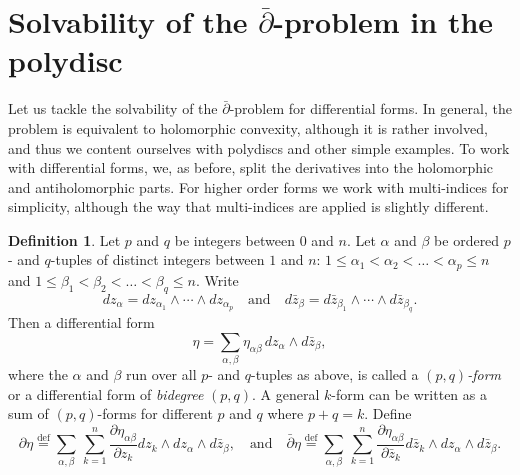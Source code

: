 \documentclass[12pt,openany]{book}
\newcommand{\myindex}[1]{#1\index{#1}}
\theoremstyle{plain}
\theoremstyle{remark}
\theoremstyle{definition}
\newtheorem{defn}[thm]{Definition}
\theoremstyle{exercise}
\theoremstyle{example}
\begin{document}

\section{Solvability of the \texorpdfstring{$\bar{\partial}$}{dbar}-problem in the polydisc} \label{sec:dbarpoly}

Let us tackle the solvability of the $\bar{\partial}$-problem for differential forms.
In general, the problem is equivalent to holomorphic convexity, although
it is rather involved, and thus we content ourselves with polydiscs and
other simple examples.
To work with differential forms, we, as before, split the derivatives
into the holomorphic and antiholomorphic parts.  For higher order forms
we work with multi-indices for simplicity, although the way that
multi-indices are applied is slightly different.

\begin{defn} \label{defn:danddbarform}
\pagebreak[2]
Let $p$ and $q$ be integers between $0$ and $n$.
Let $\alpha$ and $\beta$ be ordered $p$- and $q$-tuples of
distinct integers between $1$ and $n$:
$1 \leq \alpha_1 < \alpha_2 < \dots < \alpha_p \leq n$ and
$1 \leq \beta_1 < \beta_2 < \dots < \beta_q \leq n$.
Write
\begin{equation*}
dz_{\alpha} =
dz_{\alpha_1}
\wedge
\cdots
\wedge
dz_{\alpha_p}
\quad
\text{and}
\quad
d\bar{z}_{\beta} =
d\bar{z}_{\beta_1}
\wedge
\cdots
\wedge
d\bar{z}_{\beta_q} .
\end{equation*}
Then a differential form
\begin{equation*}
\eta =
\sum_{\alpha,\beta}
\eta_{\alpha \beta} \, dz_\alpha \wedge d\bar{z}_\beta ,
\end{equation*}
where the $\alpha$ and $\beta$ run over all $p$- and $q$-tuples
as above,
is called a
\emph{\myindex{$(p,q)$-form}} or a differential form of
\emph{\myindex{bidegree}} $(p,q)$.
A general $k$-form can be written as a sum of $(p,q)$-forms
for different $p$ and $q$ where $p+q = k$.
Define
%
%
\begin{equation*}
\partial \eta \overset{\text{def}}{=}
\sum_{\alpha,\beta}
\,
\sum_{k=1}^n
\frac{\partial \eta_{\alpha \beta}}{\partial z_k} dz_k \wedge dz_\alpha
\wedge d\bar{z}_\beta ,
\quad \text{and} \quad
\bar{\partial} \eta \overset{\text{def}}{=}
\sum_{\alpha,\beta}
\,
\sum_{k=1}^n
\frac{\partial \eta_{\alpha \beta}}{\partial \bar{z}_k} d\bar{z}_k \wedge dz_\alpha
\wedge d\bar{z}_\beta .
\end{equation*}
\end{defn}
\end{document}
